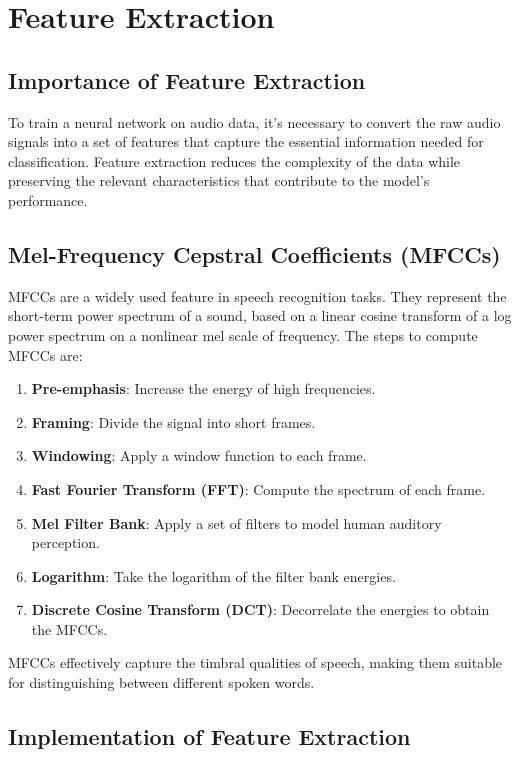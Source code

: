 \documentclass[12pt]{article}
\begin{document}
\section{Feature Extraction}

\subsection{Importance of Feature Extraction}

To train a neural network on audio data, it's necessary to convert the raw audio signals into a set of features that capture the essential information needed for classification. Feature extraction reduces the complexity of the data while preserving the relevant characteristics that contribute to the model's performance.

\subsection{Mel-Frequency Cepstral Coefficients (MFCCs)}

MFCCs are a widely used feature in speech recognition tasks. They represent the short-term power spectrum of a sound, based on a linear cosine transform of a log power spectrum on a nonlinear mel scale of frequency. The steps to compute MFCCs are:

\begin{enumerate}
    \item \textbf{Pre-emphasis}: Increase the energy of high frequencies.
    \item \textbf{Framing}: Divide the signal into short frames.
    \item \textbf{Windowing}: Apply a window function to each frame.
    \item \textbf{Fast Fourier Transform (FFT)}: Compute the spectrum of each frame.
    \item \textbf{Mel Filter Bank}: Apply a set of filters to model human auditory perception.
    \item \textbf{Logarithm}: Take the logarithm of the filter bank energies.
    \item \textbf{Discrete Cosine Transform (DCT)}: Decorrelate the energies to obtain the MFCCs.
\end{enumerate}

MFCCs effectively capture the timbral qualities of speech, making them suitable for distinguishing between different spoken words.

\subsection{Implementation of Feature Extraction}
\end{document}
